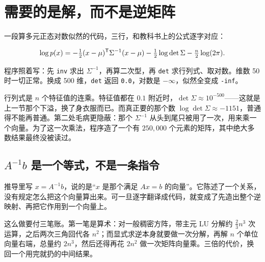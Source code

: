 \section{需要的是解，而不是逆矩阵}
\label{sec:08-Numerical-Analysis/07-Numerical-Methods-for-ML/03}

一段算多元正态对数似然的代码，三行，和教科书上的公式逐字对应：

\[
\log p(x)=-\tfrac12(x-\mu)^{\mathsf{T}}\Sigma^{-1}(x-\mu)-\tfrac12\log\det\Sigma-\tfrac{n}{2}\log(2\pi).
\]

程序照着写：先 \texttt{inv} 求出 \(\Sigma^{-1}\)，再算二次型，再 \texttt{det} 求行列式、取对数。维数 50 时一切正常。换成 500 维，\texttt{det} 返回 \texttt{0.0}，对数是 \(-\infty\)，似然全变成 \texttt{-inf}。

行列式是 \(n\) 个特征值的连乘。特征值都在 \(0.1\) 附近时，\(\det\Sigma\approx10^{-500}\)——这就是上一节那个下溢，换了身衣服而已。而真正要的那个数 \(\log\det\Sigma\approx-1151\)，普通得不能再普通。第二处毛病更隐蔽：那个 \(\Sigma^{-1}\) 从头到尾只被用了一次，用来乘一个向量。为了这一次乘法，程序造了一个有 \(250{,}000\) 个元素的矩阵，其中绝大多数结果最终没被读过。

\subsection{\(A^{-1}b\) 是一个等式，不是一条指令}

推导里写 \(x=A^{-1}b\)，说的是``\(x\) 是那个满足 \(Ax=b\) 的向量''。它陈述了一个关系，没有规定怎么把这个向量算出来。可一旦逐字翻译成代码，就变成了先造出整个逆映射、再把它作用到一个向量上。

这么做要付三笔账。第一笔是算术：对一般稠密方阵，带主元 LU 分解约 \(\tfrac23n^3\) 次运算，之后两次三角回代各 \(n^2\)；而显式求逆本身就要做一次分解，再解 \(n\) 个单位向量右端，总量约 \(2n^3\)，然后还得再花 \(2n^2\) 做一次矩阵向量乘。三倍的代价，换回一个用完就扔的中间结果。

